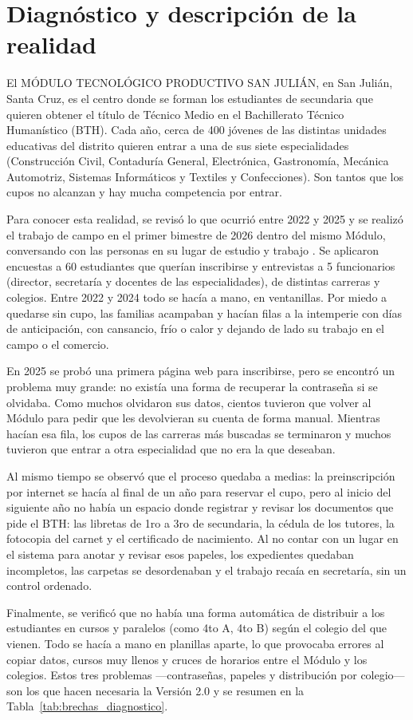 \section{Diagnóstico y descripción de la realidad}
\label{sec:diagnostico}

El MÓDULO TECNOLÓGICO PRODUCTIVO SAN JULIÁN, en San Julián, Santa Cruz, es el centro donde se forman los estudiantes de secundaria que quieren obtener el título de Técnico Medio en el Bachillerato Técnico Humanístico (BTH). Cada año, cerca de 400 jóvenes de las distintas unidades educativas del distrito quieren entrar a una de sus siete especialidades (Construcción Civil, Contaduría General, Electrónica, Gastronomía, Mecánica Automotriz, Sistemas Informáticos y Textiles y Confecciones). Son tantos que los cupos no alcanzan y hay mucha competencia por entrar.

Para conocer esta realidad, se revisó lo que ocurrió entre 2022 y 2025 y se realizó el trabajo de campo en el primer bimestre de 2026 dentro del mismo Módulo, conversando con las personas en su lugar de estudio y trabajo \parencite{hernandez2014}. Se aplicaron encuestas a 60 estudiantes que querían inscribirse y entrevistas a 5 funcionarios (director, secretaría y docentes de las especialidades), de distintas carreras y colegios. Entre 2022 y 2024 todo se hacía a mano, en ventanillas. Por miedo a quedarse sin cupo, las familias acampaban y hacían filas a la intemperie con días de anticipación, con cansancio, frío o calor y dejando de lado su trabajo en el campo o el comercio.

En 2025 se probó una primera página web para inscribirse, pero se encontró un problema muy grande: no existía una forma de recuperar la contraseña si se olvidaba. Como muchos olvidaron sus datos, cientos tuvieron que volver al Módulo para pedir que les devolvieran su cuenta de forma manual. Mientras hacían esa fila, los cupos de las carreras más buscadas se terminaron y muchos tuvieron que entrar a otra especialidad que no era la que deseaban.

Al mismo tiempo se observó que el proceso quedaba a medias: la preinscripción por internet se hacía al final de un año para reservar el cupo, pero al inicio del siguiente año no había un espacio donde registrar y revisar los documentos que pide el BTH: las libretas de 1ro a 3ro de secundaria, la cédula de los tutores, la fotocopia del carnet y el certificado de nacimiento. Al no contar con un lugar en el sistema para anotar y revisar esos papeles, los expedientes quedaban incompletos, las carpetas se desordenaban y el trabajo recaía en secretaría, sin un control ordenado.

Finalmente, se verificó que no había una forma automática de distribuir a los estudiantes en cursos y paralelos (como 4to A, 4to B) según el colegio del que vienen. Todo se hacía a mano en planillas aparte, lo que provocaba errores al copiar datos, cursos muy llenos y cruces de horarios entre el Módulo y los colegios. Estos tres problemas —contraseñas, papeles y distribución por colegio— son los que hacen necesaria la Versión 2.0 y se resumen en la Tabla~\ref{tab:brechas_diagnostico}.


